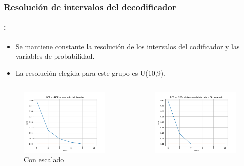 \begin{frame}
  \frametitle{\textbf{Resolución de intervalos del decodificador}}
\framesubtitle{\secname : \subsecname}

    \begin{block}{}
    \begin{itemize}
    \item Se mantiene constante la resolución de los intervalos del codificador y las variables de probabilidad.
    \item La resolución elegida para este grupo es U(10,9).
    \end{itemize}
    \end{block}
    \vspace{-0.3cm}
    \begin{columns}
    \begin{column}{0.48\paperwidth}
     \begin{figure}
     \centering
    \includegraphics[width=\textwidth]{Graficos/cuantization3.png}%
    \caption{Con escalado}
    \end{figure}
    \end{column}
    \begin{column}{0.48\paperwidth}  
    \begin{figure}
    \centering
    \includegraphics[width=\textwidth]{Graficos/cuantization6.png}%

\end{figure}
\end{column}
\end{columns}
\end{frame}
